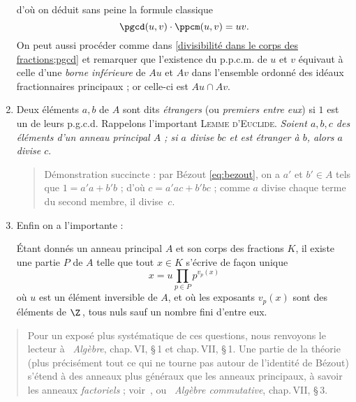 \documentclass[11pt, %
  title in boldface,
  theorem in new line,
  theorem numbering = section,
  number theorems separately,
  simple name,
]{beaulivre}
\begin{document}
\begin{enumerate}[itemsep=.3\baselineskip]
\begin{equation}
        \end{equation}
        d'où on déduit sans peine la formule classique
        \begin{equation}
            \pgcd(u,v) \cdot \ppcm(u,v) = uv.
        \end{equation}
        On peut aussi procéder comme dans \ref{divisibilité dans le corps des fractions;pgcd} et remarquer que l'existence du p.p.c.m. de \( u \) et \( v \) équivaut à celle d'une \emph{borne inférieure} de \( Au \) et \( Av \) dans l'ensemble ordonné des idéaux fractionnaires principaux ; or celle-ci est \( Au \cap Av \).
        \item Deux éléments \( a,b \) de \( A \) sont dits \emph{étrangers} (ou \emph{premiers entre eux}) si \( 1 \) est un de leurs p.g.c.d. Rappelons l'important \textsc{Lemme d'Euclide}. \emph{Soient \( a,b,c \) des éléments d'un anneau principal \( A \) ; si \( a \) divise \( bc \) et est étranger à \( b \), alors \( a \) divise \( c \)}.
        \begin{quote}
            Démonstration succincte :
            par Bézout \eqref{eq:bezout}, on a \( a' \) et \( b' \in A \) tels que \( 1 = a'a + b'b \) ; d'où \( c = a'a c + b'b c \) ; comme \( a \) divise chaque terme du second membre, il divise~\( c \).
        \end{quote}
        \item Enfin on a l'importante  :
        \begin{theorem*}
            Étant donnés un anneau principal \( A \) et son corps des fractions \( K \), il existe une partie \( P \) de \( A \) telle que tout \( x \in K \) s'écrive de façon unique
            \begin{equation}
                x = u \prod_{p \in P} p^{v_p(x)}
            \end{equation}
            où \( u \) est un élément inversible de \( A \), et où les exposants \( v_p(x) \) sont des éléments de \( \Z \)\,, tous nuls sauf un nombre fini d'entre eux.
        \end{theorem*}
    \end{enumerate}

    \begin{quote}
        Pour un exposé plus systématique de ces questions, nous renvoyons le lecteur à \cite{bourbaki1}~\emph{Algèbre}, chap.\,VI, \S\,1 et chap.\,VII, \S\,1. Une partie de la théorie (plus précisément tout ce qui ne tourne pas autour de l'identité de Bézout) s'étend à des anneaux plus généraux que les anneaux principaux, à savoir les anneaux \emph{factoriels} ; voir~\cite{samuel1964}, ou \cite{bourbaki2}~\emph{Algèbre commutative}, chap.\,VII, \S\,3.
    \end{quote}
\end{document}
